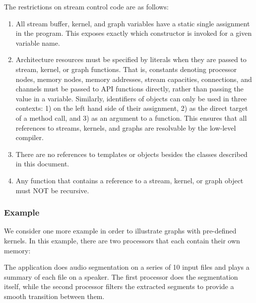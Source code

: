 The restrictions on stream control code are as follows:

\begin{enumerate}

\item All stream buffer, kernel, and graph variables have a static
single assignment in the program.  This exposes exactly which
constructor is invoked for a given variable name.

\item Architecture resources must be specified by literals when they
are passed to stream, kernel, or graph functions.  That is, constants
denoting processor nodes, memory nodes, memory addresses, stream
capacities, connections, and channels must be passed to API functions
directly, rather than passing the value in a variable.  Similarly,
identifiers of objects can only be used in three contexts: 1) on the
left hand side of their assignment, 2) as the direct target of a
method call, and 3) as an argument to a function.  This ensures that
all references to streams, kernels, and graphs are resolvable by the
low-level compiler.

\item There are no references to templates or objects besides the
classes described in this document.

\item Any function that contains a reference to a stream, kernel, or
graph object must NOT be recursive.

\end{enumerate}

\subsubsection{Example}
\label{sec:example}

We consider one more example in order to illustrate graphs with
pre-defined kernels.  In this example, there are two processors that
each contain their own memory:

\begin{figure}[h]
\begin{center}
\end{center}
\vspace{-12pt}
\end{figure}

The application does audio segmentation on a series of 10 input files
and plays a summary of each file on a speaker.  The first processor
does the segmentation itself, while the second processor filters the
extracted segments to provide a smooth transition between them.

